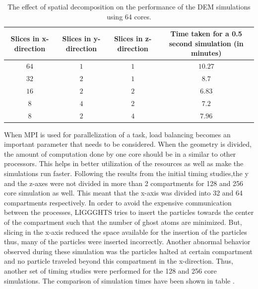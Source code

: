 \documentclass[preprint,11pt,authoryear]{elsarticle}
\begin{document}
\begin{table}
\caption{The effect of spatial decomposition on the performance of the DEM simulations using 64 cores.}
\label{table:rslts_dem_slicing_studies}
\begin{center}
\begin{tabulary}{\linewidth}{C|C|C|C}
  
\hline
\bf{Slices in x-direction}&\bf{Slices in y-direction}&\bf{Slices in z-direction}& \bf{Time taken for a 0.5 
second simulation (in minutes)}\\
\hline
$64$ & $1$ & $1$ & $10.27$\\
$32$ & $2$ & $1$ & $8.7$\\
$16$ & $2$ & $2$ & $6.83$\\
$8$ & $4$ & $2$ & $7.2$\\		  
$8$ & $2$ & $4$ & $7.96$\\
\hline  		  
\end{tabulary}
\end{center}
      
\end{table}

When MPI is used for parallelization of a task, load balancing becomes an important parameter 
that needs to be considered. When the geometry is divided, the amount of computation done by one core
should be in a similar to other processors. This helps in better utilization of the resources as well as
make the simulations run faster. Following the results from the initial timing studies,the y 
and the z-axes were not divided in more than 2 compartments for 128 and 256 core simulation as well. 
This meant that the x-axis was divided into 32 and 64 compartments respectively. In order to avoid the 
expensive communication between the processes, LIGGGHTS tries to insert the particles towards the 
center of the compartment such that the number of ghost atoms are minimized. But, slicing in the 
x-axis reduced the space available for the insertion of the particles thus, many of the particles were 
inserted incorrectly. Another abnormal behavior observed during these simulation was the particles 
halted at certain compartment and no particle traveled beyond this compartment in the x-direction. 
Thus, another set of timing studies were performed for the 128 and 256 core simulations. The 
comparison of simulation times have been shown in table .
\end{document}
